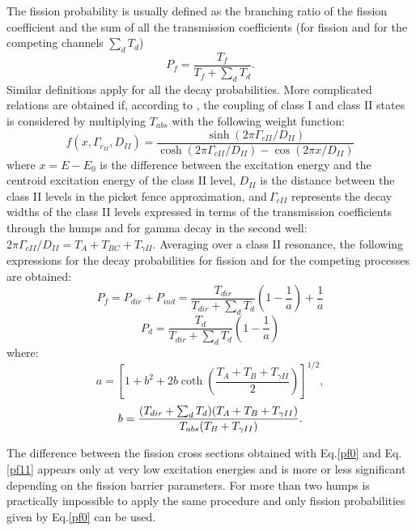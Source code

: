 The fission probability is usually defined as the branching ratio of the
fission coefficient and the sum of all the transmission coefficients (for
fission and for the competing channels $\sum_dT_d$) 
\begin{equation}
P_{f}=\frac{T_{f}}{T_{f}+\sum_{d}T_{d}}.  \label{pf0}
\end{equation}
Similar definitions apply for all the decay probabilities. More complicated
relations are obtained if, according to \cite{Back:74}, the coupling of
class I and class II states is considered by multiplying $T_{abs}$ with the
following weight function:%
\begin{equation}
f(x,\Gamma_{c_{II}},D_{II})=\frac{\sinh(2\pi\Gamma_{cII}/D_{II})}{\cosh
(2\pi\Gamma_{cII}/D_{II})-\cos(2\pi x/D_{II})}
\end{equation}
where $x=E-E_{0}$ is the difference between the excitation energy and the
centroid excitation energy of the class II level, $D_{II}$ is the distance
between the class II levels in the picket fence approximation, and$\ \Gamma
_{cII}$ represents the decay widths of the class II levels expressed in
terms of the transmission coefficients through the humps and for gamma decay
in the second well:\ $2\pi\Gamma_{cII}/D_{II}=T_{A}+T_{BC}+T_{\gamma II}.$
Averaging over a class II resonance, the following expressions for the decay
probabilities for fission and for the competing processes are obtained:%
\begin{equation}
P_{f}=P_{dir}+P_{ind}=\frac{T_{dir}}{T_{dir}+\sum_{d}T_{d}}\left( 1-\frac {1%
}{a}\right) +\frac{1}{a}  \label{pf11}
\end{equation}
\begin{equation}
P_{d}=\frac{T_{d}}{T_{dir}+\sum_{d}T_{d}}\left( 1-\frac{1}{a}\right)
\label{pd}
\end{equation}
where: 
\begin{equation}
a=\left[ 1+b^{2}+2b\coth\left( \frac{T_{A}+T_{B}+T_{\gamma II}}{2}\right) %
\right] ^{1/2},  \label{a11}
\end{equation}%
\begin{equation}
b=\frac{(T_{dir}+\sum_{d}T_{d})(T_{A}+T_{B}+T_{\gamma II})}{%
T_{abs}(T_{B}+T_{\gamma II})}.  \label{b11}
\end{equation}

The difference between the fission cross sections obtained with Eq.\ref{pf0}
and Eq.\ref{pf11} appears only at very low excitation energies and is more
or less significant depending on the fission barrier parameters. For more
than two humps is practically impossible to apply the same procedure and
only fission probabilities given by Eq.\ref{pf0} can be used.

